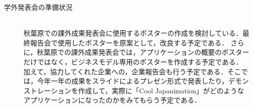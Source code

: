 \begin{description}
\item[学外発表会の準備状況]\mbox{}\\ 
秋葉原での課外成果発表会に使用するポスターの作成を検討している．最終報告会で使用したポスターを原案として，改良する予定である．
さらに，秋葉原での課外成果発表会では，アプリケーションの概要のポスターだけではなく，ビジネスモデル専用のポスターを作成する予定である．
\per
加えて，協力してくれた企業への，企業報告会も行う予定である．そこでは，今年一年の成果をスライドによるプレゼン形式で発表したり，デモンストレーションを作成して，実際に「Cool Japanimation」がどのようなアプリケーションになったのかをみてもらう予定である．

\end{description}
